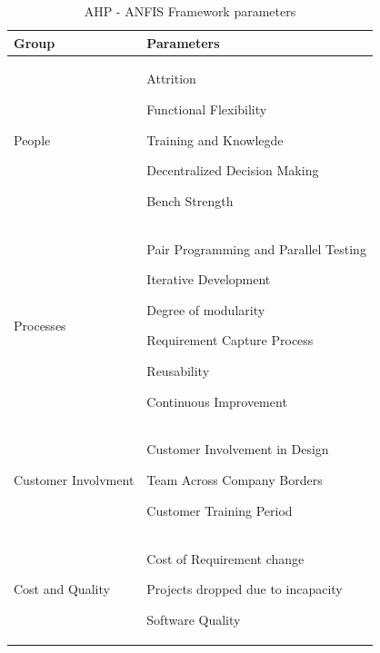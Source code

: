 \begin{table} [H]
\begin{tabular}{| p{3cm} | p{12cm}|}
    \hline
     \textbf{Group} & \textbf{Parameters} \\ \hline
     People  &  \begin{inparaenum} [a\upshape)] \item Attrition \item Functional Flexibility \item Training and Knowlegde \item Decentralized Decision Making \item Bench Strength \end{inparaenum} \\ \hline
     Processes  & \begin{inparaenum} [a\upshape)] \item Pair Programming and Parallel Testing \item Iterative Development \item Degree of modularity \item Requirement Capture Process \item Reusability \item Continuous Improvement
     \end{inparaenum} \\ \hline
    Customer Involvment & \begin{inparaenum} [a\upshape)] \item Customer Involvement in Design \item Team Across Company Borders \item Customer Training Period \end{inparaenum} \\ \hline
     Cost and Quality  & \begin{inparaenum} [a\upshape)] \item Cost of Requirement change \item Projects dropped due to incapacity \item Software Quality \end{inparaenum} \\ \hline
  \end{tabular}
\caption{AHP - ANFIS Framework parameters}
\label{anfis_framework}
\end{table}

